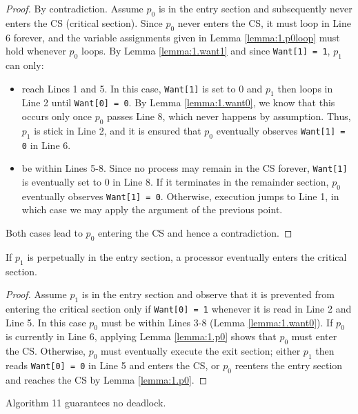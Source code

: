 \begin{proof}
By contradiction. Assume $p_0$ is in the entry section and subsequently
never enters the CS (critical section).
Since $p_0$ never enters the CS, it must loop in Line 6 forever, and
the variable assignments given in Lemma \ref{lemma:1.p0loop} must hold
whenever $p_0$ loops. By Lemma \ref{lemma:1.want1} and since 
\lstinline|Want[1] = 1|, $p_1$ can only:

\begin{itemize}
\item reach Lines 1 and 5. In this case, \lstinline|Want[1]| is set to 0 and $p_1$
      then loops in Line 2 until \lstinline|Want[0] = 0|. By Lemma \ref{lemma:1.want0},
      we know that this occurs only once $p_0$ passes Line 8, which never 
      happens by assumption. Thus, $p_1$ is stick in Line 2, and it is ensured 
      that $p_0$ eventually observes \lstinline|Want[1] = 0| in Line 6.
\item be within Lines 5-8. Since no process may remain in the CS forever, \lstinline|Want[1]|
      is eventually set to 0 in Line 8. If it terminates in the remainder section,
      $p_0$ eventually observes \lstinline|Want[1] = 0|. Otherwise, execution
      jumps to Line 1, in which case we may apply the argument of the previous point.      
\end{itemize}

Both cases lead to $p_0$ entering the CS and hence a contradiction.
\end{proof}

\begin{lemma} \label{lemma:1.p1}
If $p_1$ is perpetually in the entry section, a processor eventually enters the 
critical section.
\end{lemma}

\begin{proof}
Assume $p_1$ is in the entry section and observe that it
is prevented from entering the critical section only if \lstinline|Want[0] = 1|
whenever it is read in Line 2 and Line 5. In this case $p_0$ must be within Lines
3-8 (Lemma \ref{lemma:1.want0}). If $p_0$ is currently in Line 6, applying Lemma
\ref{lemma:1.p0} shows that $p_0$ must enter the CS. Otherwise, $p_0$ must
eventually execute the exit section; either $p_1$ then reads \lstinline|Want[0] = 0|
in Line 5 and enters the CS, or $p_0$ reenters the entry section and reaches the
CS by Lemma \ref{lemma:1.p0}.
\end{proof}

\begin{theorem}
Algorithm 11 guarantees no deadlock.
\end{theorem}

